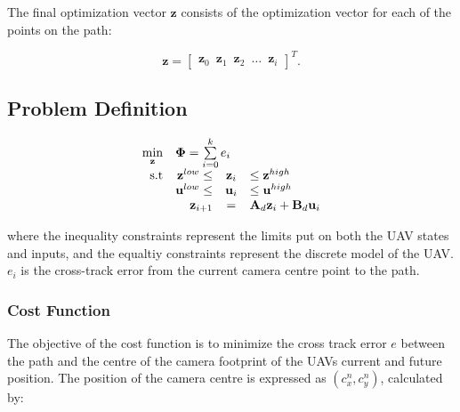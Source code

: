 The final optimization vector $\mathbf{z}$ consists of the optimization vector for each of the points on the path:

\begin{equation}
	\mathbf{z} = 
	\begin{bmatrix}
		\mathbf{z}_0 \hspace{6pt} \mathbf{z}_1 \hspace{6pt} \mathbf{z}_2 \hspace{6pt} \hdots \hspace{6pt} \mathbf{z}_i
	\end{bmatrix}^T.
\end{equation}


\subsection*{Problem Definition}

\begin{equation}
	\begin{array}{rrclcl}
		\displaystyle \min_{\mathbf{z}} & \multicolumn{3}{l}{\bm{\Phi} = \sum\limits_{i=0}^k e_i} \\
		\textrm{s.t}
		& \mathbf{z}^{low} \leq & \mathbf{z}_i & \leq \mathbf{z}^{high} \\
		& \mathbf{u}^{low} \leq & \mathbf{u}_i & \leq \mathbf{u}^{high} \\
		& \displaystyle \mathbf{z}_{i+1} & = & \mathbf{A}_d \mathbf{z}_i + \mathbf{B}_d \mathbf{u}_i
	\end{array}
\end{equation}

where the inequality constraints represent the limits put on both the UAV states and inputs, and the equaltiy constraints represent the discrete model of the UAV. $e_i$ is the cross-track error from the current camera centre point to the path.


\subsubsection*{Cost Function}

The objective of the cost function is to minimize the cross track error $e$ between the path and the centre of the camera footprint of the UAVs current and future position. The position of the camera centre is expressed as $(c_x^n, c_y^n)$, calculated by:

